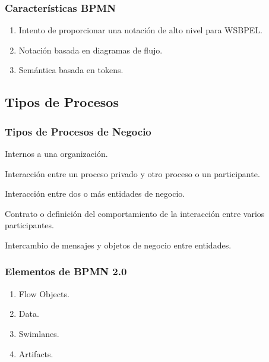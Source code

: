 \documentclass[a4paper,slidestop,xcolor=pst,blue]{beamer}
\begin{document}
\begin{frame}[c]
    \frametitle{Características BPMN}
    \begin{enumerate}[<+->]
        \item Intento de proporcionar una notación de alto nivel para WSBPEL.
        \item Notación basada en diagramas de flujo.
        \item Semántica basada en tokens.
    \end{enumerate}
\end{frame}

\subsection{Tipos de Procesos}

\begin{frame}[c]
    \frametitle{Tipos de Procesos de Negocio}
    \begin{description}[<+->]
        \item[Privados] Internos a una organización.
        \item[Públicos] Interacción entre un proceso privado y otro proceso o un participante.
        \item[Colaboración] Interacción entre dos o más entidades de negocio.
        \item[Coreografías] Contrato o definición del comportamiento de la interacción entre varios participantes.
        \item[Conversaciones] Intercambio de mensajes y objetos de negocio entre entidades.
    \end{description}
\end{frame}

\begin{frame}[c]
    \frametitle{Elementos de BPMN 2.0}
    \begin{enumerate}[<+->]
        \item Flow Objects.
        \item Data.
        \item Swimlanes.
        \item Artifacts.
    \end{enumerate}
\end{frame}
\end{document}
